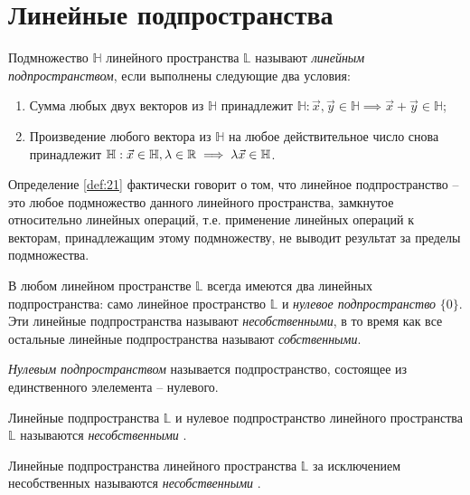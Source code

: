 \section{Линейные подпространства}

\begin{definition}\label{def:21}
  Подмножество $\mathbb{H}$ линейного пространства $\mathbb{L}$ называют \textit{линейным подпространством}, если выполнены следующие два условия:
  \begin{enumerate}
    \item Сумма любых двух векторов из $\mathbb{H}$ принадлежит $\mathbb{H}: \vec{x}, \vec{y} \in \mathbb{H} \implies \vec{x} + \vec{y} \in \mathbb{H}$;
    \item Произведение любого вектора из $\mathbb{H}$ на любое действительное число снова принадлежит $\mathbb{H}: \vec{x} \in \mathbb{H}, \lambda \in \mathbb{R} \implies \lambda \vec{x} \in \mathbb{H}$.
  \end{enumerate}
\end{definition}

Определение \ref{def:21} фактически говорит о том, что линейное подпространство -- это любое подмножество данного линейного пространства, замкнутое относительно линейных операций, т.е. применение линейных операций к векторам, принадлежащим этому подмножеству, не выводит результат за пределы подмножества.

В любом линейном пространстве $\mathbb{L}$ всегда имеются два линейных подпространства: само линейное пространство $\mathbb{L}$ и \textit{нулевое подпространство} $\{ 0 \}$. Эти линейные подпространства называют \textit{несобственными}, в то время как все остальные линейные подпространства называют \textit{собственными}.

\begin{definition}
  \textit{Нулевым подпространством} называется подпространство, состоящее из единственного элелемента -- нулевого.
\end{definition}

\begin{definition}
  Линейные подпространства $\mathbb{L}$ и нулевое подпространство линейного пространства $\mathbb{L}$ называются \textit{несобственными} .
\end{definition}

\begin{definition}
  Линейные подпространства линейного пространства $\mathbb{L}$ за исключением несобственных называются \textit{несобственными} .
\end{definition}


